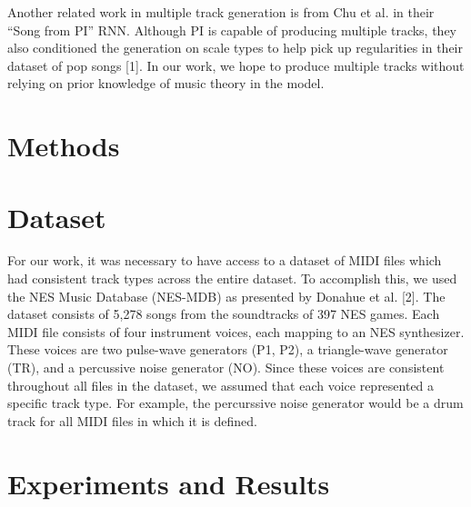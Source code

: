 \documentclass{article}
\begin{document}
Another related work in multiple track generation is from Chu et al. in their “Song from PI” RNN. Although PI is capable of producing multiple tracks, they also conditioned the generation on scale types to help pick up regularities in their dataset of pop songs [1]. In our work, we hope to produce multiple tracks without relying on prior knowledge of music theory in the model.


\section{Methods}




\section{Dataset}


For our work, it was necessary to have access to a dataset of MIDI files which had consistent track types across the entire dataset. To accomplish this, we used the NES Music Database (NES-MDB) as presented by Donahue et al. [2]. The dataset consists of 5,278 songs from the soundtracks of 397 NES games. Each MIDI file consists of four instrument voices, each mapping to an NES synthesizer. These voices are two pulse-wave generators (P1, P2), a triangle-wave generator (TR), and a percussive noise generator (NO). Since these voices are consistent throughout all files in the dataset, we assumed that each voice represented a specific track type. For example, the percurssive noise generator would be a drum track for all MIDI files in which it is defined.


\section{Experiments and Results}
\end{document}
